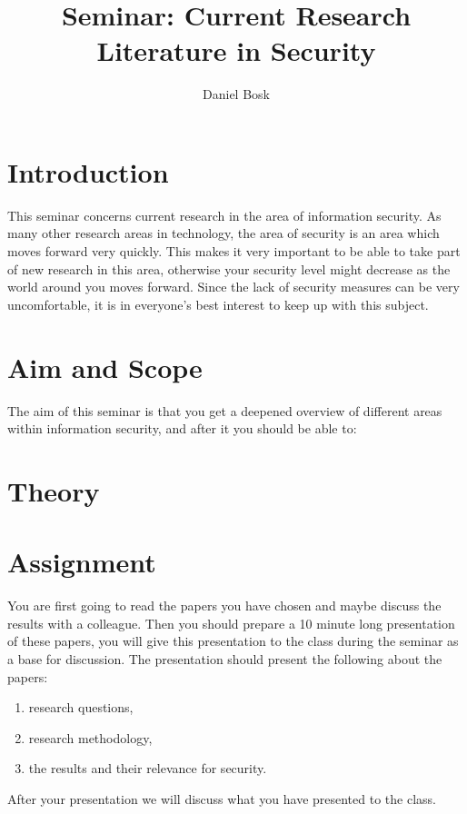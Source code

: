 \documentclass[a4paper]{llncs}
\title{Seminar: Current Research Literature in Security}
\author{%
  Daniel Bosk
}
\institute{%
  Department of Information and Communication Systems\\
  Mid Sweden University, Sundsvall
}
\begin{document}
\maketitle


\section{Introduction}%
\label{sec:Introduction}

This seminar concerns current research in the area of information security.
As many other research areas in technology, the area of security is an area 
which moves forward very quickly.
This makes it very important to be able to take part of new research in this 
area, otherwise your security level might decrease as the world around you 
moves forward.
Since the lack of security measures can be very uncomfortable, it is in 
everyone's best interest to keep up with this subject.


\section{Aim and Scope}%
\label{sec:Syfte}

The aim of this seminar is that you get a deepened overview of different areas 
within information security, and after it you should be able to:
\begin{itemize}
	
\end{itemize}


\section{Theory}%
\label{sec:Theory}




\section{Assignment}

You are first going to read the papers you have chosen and maybe discuss the 
results with a colleague.
Then you should prepare a 10 minute long presentation of these papers, you will 
give this presentation to the class during the seminar as a base for 
discussion.
The presentation should present the following about the papers:
\begin{enumerate}
  \item research questions,
  \item research methodology,
  \item the results and their relevance for security.
\end{enumerate}
After your presentation we will discuss what you have presented to the class.
\end{document}
